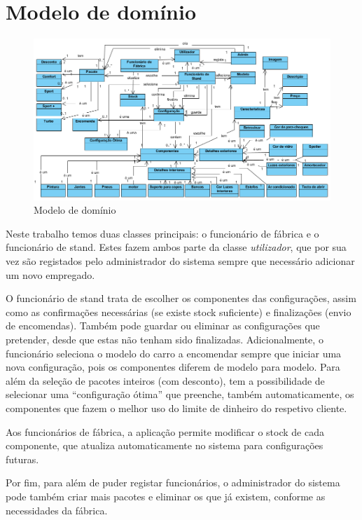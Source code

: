 \section{Modelo de domínio}

\begin{figure}[h]
    \centering
    \includegraphics[width=\textwidth]{analise_de_requisitos/img/modelo_de_dominio.png}
    \caption{Modelo de domínio}
    \label{fig:modelo_de_dominio}
\end{figure}


Neste trabalho temos duas classes principais: o funcionário de fábrica e o funcionário de stand. Estes fazem ambos parte da classe \textit{utilizador}, que por sua vez são registados pelo administrador do sistema sempre que necessário adicionar um novo empregado.

O funcionário de stand trata de escolher os componentes das configurações, assim como as confirmações necessárias (se existe stock suficiente) e finalizações (envio de encomendas). Também pode guardar ou eliminar as configurações que pretender, desde que estas não tenham sido finalizadas. Adicionalmente, o funcionário seleciona o modelo do carro a encomendar sempre que iniciar uma nova configuração, pois os componentes diferem de modelo para modelo. Para além da seleção de pacotes inteiros (com desconto), tem a possibilidade de selecionar uma “configuração ótima” que preenche, também automaticamente, os componentes que fazem o melhor uso do limite de dinheiro do respetivo cliente.

Aos funcionários de fábrica, a aplicação permite modificar o stock de cada componente, que atualiza automaticamente no sistema para configurações futuras.

Por fim, para além de puder registar funcionários, o administrador do sistema pode também criar mais pacotes e eliminar os que já existem, conforme as necessidades da fábrica.

\clearpage